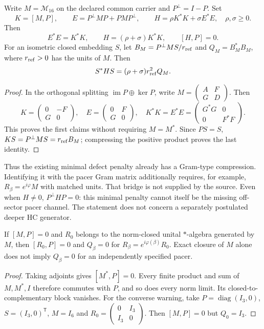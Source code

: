 \begin{proposition}
\label{v480:native-penalty-identity}
Write $M=\mathcal M_{16}$ on the declared common carrier and
$P^\perp=I-P$. Set
\[
 K=[M,P],\qquad E=P^\perp MP+PMP^\perp,
 \qquad H=\rho K^*K+\sigma E^*E,
 \quad \rho,\sigma\geq0.
\]
Then
\[
 E^*E=K^*K,\qquad H=(\rho+\sigma)K^*K,
 \qquad [H,P]=0.
\]
For an isometric closed embedding $S$, let
$B_M=P^\perp MS/r_{\rm ref}$ and $Q_M=B_M^*B_M$, where
$r_{\rm ref}>0$ has the units of $M$. Then
\[
 S^*HS=(\rho+\sigma)r_{\rm ref}^2Q_M.
\]
\end{proposition}
\begin{proof}
In the orthogonal splitting $\operatorname{im}P\oplus\ker P$,
write $M=\left(\begin{smallmatrix}A&F\\G&D\end{smallmatrix}\right)$.
Then
\[
 K=\begin{pmatrix}0&-F\\G&0\end{pmatrix},\quad
 E=\begin{pmatrix}0&F\\G&0\end{pmatrix},\quad
 K^*K=E^*E=\begin{pmatrix}G^*G&0\\0&F^*F\end{pmatrix}.
\]
This proves the first claims without requiring $M=M^*$.
Since $PS=S$, $KS=P^\perp MS=r_{\rm ref}B_M$;
compressing the positive product proves the last identity.
\end{proof}

Thus the existing minimal defect penalty already has a Gram-type
compression. Identifying it with the pacer Gram matrix additionally
requires, for example, $R_\beta=e^{i\varphi}M$ with matched units.
That bridge is not supplied by the source. Even when $H\ne0$,
$P^\perp HP=0$: this minimal penalty cannot itself be the missing
off-sector pacer channel. The statement does not concern a separately
postulated deeper HC generator.

\begin{proposition}
\label{v480:native-closure-transfer}
If $[M,P]=0$ and $R_0$ belongs to the norm-closed unital
$*$-algebra generated by $M$, then $[R_0,P]=0$ and
$Q_\beta=0$ for $R_\beta=e^{i\varphi(\beta)}R_0$.
Exact closure of $M$ alone does not imply $Q_\beta=0$
for an independently specified pacer.
\end{proposition}
\begin{proof}
Taking adjoints gives $[M^*,P]=0$. Every finite product and sum
of $M,M^*,I$ therefore commutes with $P$, and so does every norm
limit. Its closed-to-complementary block vanishes. For the converse
warning, take $P=\operatorname{diag}(I_3,0)$,
$S=(I_3,0)^{\mathsf T}$, $M=I_6$ and
$R_0=\left(\begin{smallmatrix}0&I_3\\I_3&0\end{smallmatrix}\right)$.
Then $[M,P]=0$ but $Q_0=I_3$.
\end{proof}

